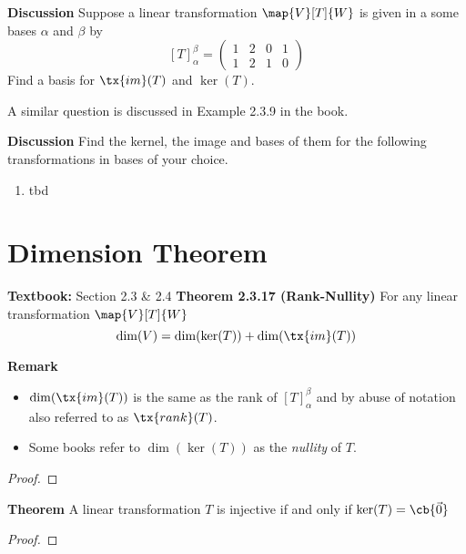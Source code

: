 \documentclass[letterpaper, 10pt]{article}
\begin{document}
\vspace{200pt}
\lb
\textbf{Discussion} 
\lb
Suppose a linear transformation $\map{V}[T]{W}$ is given in a some bases $α$ and $β$ by
\[ [T]_α^β = \begin{pmatrix} 1 & 2 & 0 & 1 \\ 1 & 2 & 1 & 0 \end{pmatrix} \]
Find a basis for $\tx{im}(T)$ and $\ker(T)$.







\newpage
\lb
A similar question is discussed in Example 2.3.9 in the book.


\lb
\textbf{Discussion}
\lb
Find the kernel, the image and bases of them for
the following transformations in bases of your choice.

\begin{enumerate}
    \item tbd
\end{enumerate}






\newpage
\section*{Dimension Theorem}%

\textbf{Textbook:} Section 2.3 \& 2.4
\lb
\textbf{Theorem 2.3.17 (Rank-Nullity)}
\lb
For any linear transformation $\map{V}[T]{W}$
\[ \dim(V) = \dim(\ker(T)) + \dim( \tx{im}(T)) \]


\lb
\textbf{Remark} 
\begin{itemize}
    \item 
        $\dim( \tx{im}(T))$ is the same as the rank of $[T]_α^β$ and by abuse of
        notation also referred to as $\tx{rank}(T)$.
    \item
        Some books refer to $\dim(\ker(T))$ as the \emph{nullity} of $T$.
\end{itemize}

\begin{proof}
\end{proof}


\vspace{300pt}
\lb
\textbf{Theorem}
\lb
A linear transformation $T$ is injective if and only if $\ker(T) = \cb{\vec 0}$
\begin{proof}
\end{proof}
\end{document}
